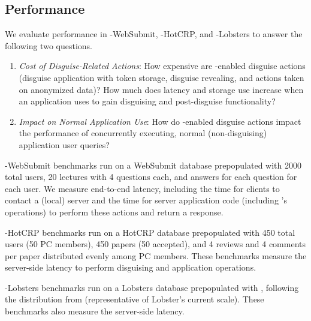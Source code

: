 \subsection{Performance}

We evaluate performance in \sys-WebSubmit, \sys-HotCRP, and \sys-Lobsters to answer the
following two questions.
\begin{enumerate}
\item \emph{Cost of Disguise-Related Actions}: How expensive are \sys-enabled disguise actions
(disguise application with token storage, disguise revealing, and actions taken on anonymized data)?
How much does latency and storage use increase when an application uses \sys to gain disguising and post-disguise functionality?
\item \emph{Impact on Normal Application Use}: How do \sys-enabled disguise actions impact the
    performance of concurrently executing, normal (non-disguising) application user queries?
\end{enumerate}

\sys-WebSubmit benchmarks run on a WebSubmit database prepopulated with 2000 total users, 20 lectures
with 4 questions each, and answers for each question for each user.
We measure end-to-end latency, including the time for clients to contact a (local)
server and the time for server application code (including \sys's operations) to perform these
actions and return a response.

\sys-HotCRP benchmarks run on a HotCRP database prepopulated with 450 total users (50 PC members), 450
papers (50 accepted), and 4 reviews and 4 comments per paper distributed evenly among PC members.  
These benchmarks measure the server-side latency to perform disguising and application operations.

\sys-Lobsters benchmarks run on a Lobsters database prepopulated with , following the
distribution from  (representative of Lobster's current
scale). These benchmarks also measure the server-side latency.

